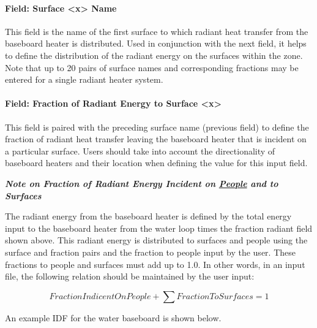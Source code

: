 \paragraph{Field: Surface \textless{}x\textgreater{} Name}\label{field-surface-x-name}

This field is the name of the first surface to which radiant heat transfer from the baseboard heater is distributed. Used in conjunction with the next field, it helps to define the distribution of the radiant energy on the surfaces within the zone. Note that up to 20 pairs of surface names and corresponding fractions may be entered for a single radiant heater system.

\paragraph{Field: Fraction of Radiant Energy to Surface \textless{}x\textgreater{}}\label{field-fraction-of-radiant-energy-to-surface-x}

This field is paired with the preceding surface name (previous field) to define the fraction of radiant heat transfer leaving the baseboard heater that is incident on a particular surface. Users should take into account the directionality of baseboard heaters and their location when defining the value for this input field.

\textbf{\emph{Note on Fraction of Radiant Energy Incident on \hyperref[people]{People} and to Surfaces}}

The radiant energy from the baseboard heater is defined by the total energy input to the baseboard heater from the water loop times the fraction radiant field shown above. This radiant energy is distributed to surfaces and people using the surface and fraction pairs and the fraction to people input by the user. These fractions to people and surfaces must add up to 1.0. In other words, in an input file, the following relation should be maintained by the user input:

\begin{equation}
FractionIndicentOnPeople + \sum {FractionToSurfaces = 1}
\end{equation}

An example IDF for the water baseboard is shown below.


